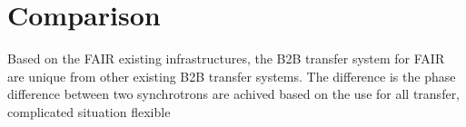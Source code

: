 \section{Comparison}

Based on the FAIR existing infrastructures, the B2B transfer system for FAIR are unique from other existing B2B transfer systems. The difference is the phase difference between two synchrotrons are achived based on the 
use for all transfer, complicated situation flexible



%
%





